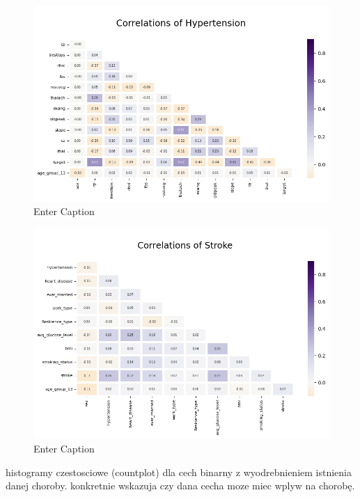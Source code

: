\documentclass[onecolumn,12pt]{article}
\begin{document}
\begin{figure}
    \centering
    \includegraphics[width=0.9\linewidth]{raport/graphs/hypertension_corr.png}
    \caption{Enter Caption}
    \label{fig:enter-label}
\end{figure}

\begin{figure}
    \centering
    \includegraphics[width=0.9\linewidth]{raport/graphs/stroke_corr.png}
    \caption{Enter Caption}
    \label{fig:enter-label}
\end{figure}


histogramy czestosciowe (countplot) dla cech binarny z wyodrebnieniem istnienia danej choroby. konkretnie wskazuja czy dana cecha moze miec wplyw na chorobę.
\end{document}
